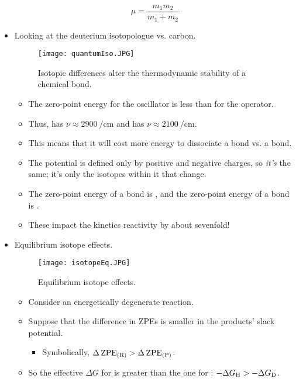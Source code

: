 \documentclass[../notes.tex]{subfiles}
\begin{document}
\begin{itemize}
    \begin{equation*}
        \mu = \frac{m_1m_2}{m_1+m_2}
    \end{equation*}
    \item Looking at the deuterium isotopologue vs. carbon.
    \begin{figure}[h!]
        \centering
        \texttt{[image: quantumIso.JPG]}
        \caption{Isotopic differences alter the thermodynamic stability of a chemical bond.}
        \label{fig:quantumIso}
    \end{figure}
    \begin{itemize}
        \item The zero-point energy for the  oscillator is less than for the  operator.
        \item Thus,  has $\nu\approx\SI{2900}{\per\centi\meter}$ and  has $\nu\approx\SI{2100}{\per\centi\meter}$.
        \item This means that it will cost more energy to dissociate a  bond vs. a  bond.
        \item The potential is defined only by positive and negative charges, so \emph{it's} the same; it's only the isotopes within it that change.
        \item The zero-point energy of a  bond is , and the zero-point energy of a  bond is .
        \item These  impact the kinetics reactivity by about sevenfold!
    \end{itemize}
    \pagebreak
    \item Equilibrium isotope effects.
    \begin{figure}[h!]
        \centering
        \texttt{[image: isotopeEq.JPG]}
        \caption{Equilibrium isotope effects.}
        \label{fig:isotopeEq}
    \end{figure}
    \begin{itemize}
        \item Consider an energetically degenerate reaction.
        \item Suppose that the difference in ZPEs is smaller in the products' slack potential.
        \begin{itemize}
            \item Symbolically, $\Delta\operatorname{ZPE}_\text{(R)}>\Delta\operatorname{ZPE}_\text{(P)}$.
        \end{itemize}
        \item So the effective $\Delta G$ for  is greater than the one for : $-\Delta G_{\ce{H}}>-\Delta G_{\ce{D}}$.

\end{itemize}
\end{itemize}
\end{document}
